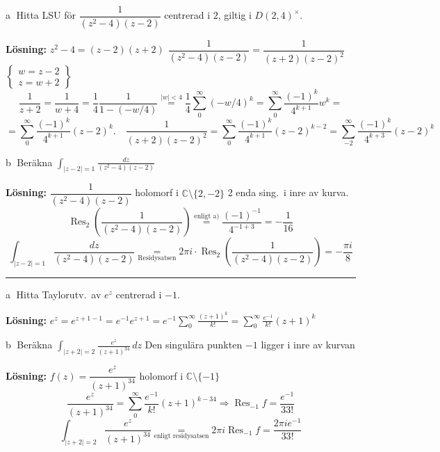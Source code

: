  \quad \textcircled{a} Hitta LSU för $\dfrac{1}{(z^2 - 4)(z - 2)}$ centrerad i $2$, giltig i $D(2, 4)^\times$.

\textbf{Lösning:} $z^2 - 4 = (z - 2)(z + 2)$ \quad $\dfrac{1}{(z^2 - 4)(z - 2)} = \dfrac{1}{(z + 2)(z - 2)^2}$ \quad $\left\{ \begin{array}{l} w = z - 2 \\ z = w + 2 \end{array} \right\}$
\[ \frac{1}{z + 2} = \frac{1}{w + 4} = \frac{1}{4} \frac{1}{1 - (-w/4)} \overset{|w| < 4}{=} \frac{1}{4} \sum_0^\infty (-w/4)^k = \sum_0^\infty \frac{(-1)^k}{4^{k+1}} w^k = \]
\[ = \sum_0^\infty \frac{(-1)^k}{4^{k+1}} (z - 2)^k. \quad \frac{1}{(z + 2)(z - 2)^2} = \sum_0^\infty \frac{(-1)^k}{4^{k+1}} (z - 2)^{k-2} = \sum_{-2}^\infty \frac{(-1)^k}{4^{k+3}} (z - 2)^k \]

\textcircled{b} Beräkna $\displaystyle\int_{|z - 2| = 1} \frac{dz}{(z^2 - 4)(z - 2)}$

\textbf{Lösning:} $\dfrac{1}{(z^2 - 4)(z - 2)}$ holomorf i $\mathbb{C} \setminus \{2, -2\}$
\textcolor{magenta!80!black}{2 enda sing.\ i inre av kurva.}
\[ \operatorname{Res}_2\left( \frac{1}{(z^2 - 4)(z - 2)} \right) \overset{\text{enligt a)}}{=} \frac{(-1)^{-1}}{4^{-1+3}} = -\frac{1}{16} \]
\[ \int_{|z - 2| = 1} \frac{dz}{(z^2 - 4)(z - 2)} \underset{\text{Residysatsen}}{=} 2\pi i \cdot \operatorname{Res}_2\left( \frac{1}{(z^2 - 4)(z - 2)} \right) = -\frac{\pi i}{8} \]

\noindent\rule{\linewidth}{0.4pt}

 \quad \textcircled{a} Hitta Taylorutv.\ av $e^z$ centrerad i $-1$.

\textbf{Lösning:} $e^z = e^{z + 1 - 1} = e^{-1}e^{z + 1} = e^{-1} \displaystyle\sum_0^\infty \frac{(z + 1)^k}{k!} = \sum_0^\infty \frac{e^{-1}}{k!} (z + 1)^k$

\textcircled{b} Beräkna $\displaystyle\int_{|z + 2| = 2} \frac{e^z}{(z + 1)^{34}}\,dz$
Den singulära punkten $-1$ ligger i inre av kurvan

\textbf{Lösning:} $f(z) = \dfrac{e^z}{(z + 1)^{34}}$ holomorf i $\mathbb{C} \setminus \{-1\}$
\[ \frac{e^z}{(z + 1)^{34}} = \sum_0^\infty \frac{e^{-1}}{k!} (z + 1)^{k - 34} \Rightarrow \operatorname{Res}_{-1} f = \frac{e^{-1}}{33!} \]
\[ \int_{|z + 2| = 2} \frac{e^z}{(z + 1)^{34}} \underset{\text{enligt residysatsen}}{=} 2\pi i \operatorname{Res}_{-1} f = \frac{2\pi i e^{-1}}{33!} \]
